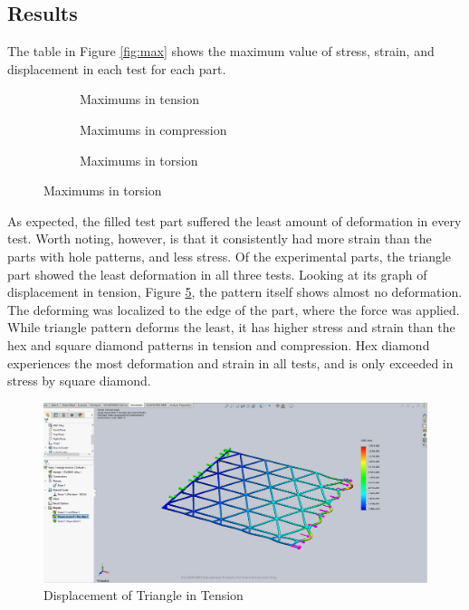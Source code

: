 \documentclass[12pt, letterpaper]{article}
\begin{document}
\subsection{Results}
\label{sec:results}

The table in Figure \ref{fig:max} shows the maximum value of stress, strain, and displacement in each test for each part. 

\begin{figure}[H]
	\centering
	\caption{Maximum values reached for displacement, stress, and strain, per test and part}
	\label{fig:max}
	\begin{subfigure}[b]{0.8\linewidth}
		\caption{Maximums in tension}
		\label{tab:tension}
	\end{subfigure}
	\begin{subfigure}[b]{0.8\linewidth}
		\caption{Maximums in compression}
		\label{tab:compression}
	\end{subfigure}
	\begin{subfigure}[b]{0.8\linewidth}
		\caption{Maximums in torsion}
		\label{tab:torsion}
	\end{subfigure}
\end{figure}

As expected, the filled test part suffered the least amount of deformation in every test. Worth noting, however, is that it consistently had more strain than the parts with hole patterns, and less stress. 
Of the experimental parts, the triangle part showed the least deformation in all three tests. Looking at its graph of displacement in tension, Figure \ref{fig:t-te-d}, the pattern itself shows almost no deformation. The deforming was localized to the edge of the part, where the force was applied. While triangle pattern deforms the least, it has higher stress and strain than the hex and square diamond patterns in tension and compression.
Hex diamond experiences the most deformation and strain in all tests, and is only exceeded in stress by square diamond. 

\begin{figure}[H]
	\centering
	\includegraphics[width=0.8\linewidth]{./graphs/tension/triangle-tension-displacement}
	\caption{Displacement of Triangle in Tension}
	\label{fig:t-te-d}
\end{figure}
\end{document}
